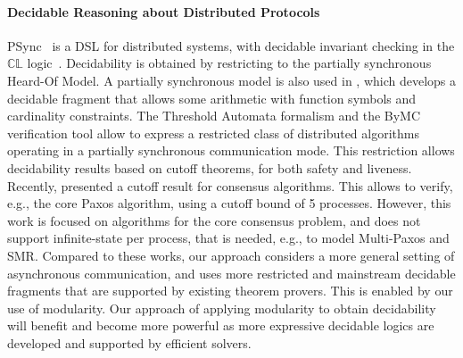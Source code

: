 \paragraph{Decidable Reasoning about Distributed Protocols}
\begin{sloppypar}
PSync~\cite{dragoi_psync:_2016} is a DSL for distributed systems, with
decidable invariant checking in the $\mathbb{CL}$
logic~\cite{dragoi_logic-based_2014}.  Decidability is obtained by
restricting to the partially synchronous Heard-Of Model. A partially
synchronous model is also used in \cite{alberti_counting_2016}, which
develops a decidable fragment that allows some arithmetic with
function symbols and cardinality constraints.
%
The Threshold Automata formalism and the ByMC verification tool
\cite{vienna_book,konnov_smt_2015,konnov_short_2017,DBLP:conf/ershov/KonnovVW15}
allow to express a restricted class of distributed algorithms
operating in a partially synchronous communication mode. This
restriction allows decidability results based on cutoff theorems, for
both safety and liveness.
%
Recently, \cite{MSB17} presented a cutoff result for consensus
algorithms. This allows to verify, e.g., the core Paxos algorithm,
using a cutoff bound of 5 processes. However, this work is focused on
algorithms for the core consensus problem, and does not support
infinite-state per process, that is needed, e.g., to model Multi-Paxos
and SMR.
%
Compared to these works, our approach considers a more general setting
of asynchronous communication, and uses more restricted and mainstream
decidable fragments that are supported by existing theorem
provers. This is enabled by our use of modularity. Our approach of
applying modularity to obtain decidability will benefit and become
more powerful as more expressive decidable logics are developed and
supported by efficient solvers.
\end{sloppypar}



